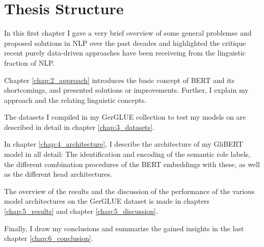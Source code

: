 \section{Thesis Structure}

In this first chapter I gave a very brief overview of some general problemse and proposed solutions in
NLP over the past decades and highlighted the critique recent purely data-driven approaches have been
receiveing from the linguistic fraction of NLP.

Chapter \ref{chap:2_approach} introduces the basic concept of BERT and its shortcomings,
and presented solutions or improvements. Further, I explain my approach and the relating
linguistic concepts.

The datasets I compiled in my GerGLUE collection to test my models on are described in detail in
chapter \ref{chap:3_datasets}.

In chapter \ref{chap:4_architecture}, I describe the architecture of my GliBERT model in all
detail: The identification and encoding of the semantic role labels, the different combination
procedures of the BERT embeddings with these, as well as the different head architectures.

The overview of the results and the discussion of the performance of the various model architectures on
the GerGLUE dataset is made in chapters \ref{chap:5_results} and chapter \ref{chap:5_discussion}.

Finally, I draw my conclusions and summarize the gained insights in the last chapter \ref{chap:6_conclusion}.

